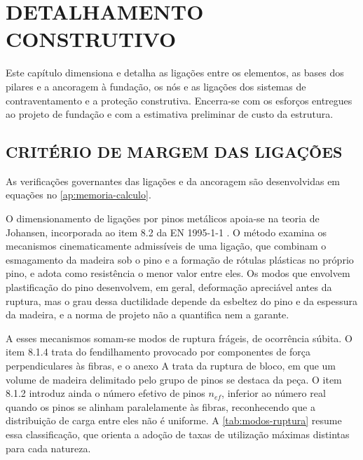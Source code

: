 
\chapter{DETALHAMENTO CONSTRUTIVO}\label{cap:detalhamento}

Este capítulo dimensiona e detalha as ligações entre os elementos, as bases dos
pilares e a ancoragem à fundação, os nós e as ligações dos sistemas de
contraventamento e a proteção construtiva. Encerra-se com os esforços entregues
ao projeto de fundação e com a estimativa preliminar de custo da estrutura.

\section{CRITÉRIO DE MARGEM DAS LIGAÇÕES}\label{sec:criterio-ligacoes}

As verificações governantes das ligações e da ancoragem são desenvolvidas em
equações no \autoref{ap:memoria-calculo}.

O dimensionamento de ligações por pinos metálicos apoia-se na teoria de
Johansen, incorporada ao item 8.2 da EN 1995-1-1 \cite{EN1995-1-1:2004}. O
método examina os mecanismos cinematicamente admissíveis de uma ligação, que
combinam o esmagamento da madeira sob o pino e a formação de rótulas plásticas
no próprio pino, e adota como resistência o menor valor entre eles. Os modos
que envolvem plastificação do pino desenvolvem, em geral, deformação apreciável
antes da ruptura, mas o grau dessa ductilidade depende da esbeltez do pino e da
espessura da madeira, e a norma de projeto não a quantifica nem a garante.

A esses mecanismos somam-se modos de ruptura frágeis, de ocorrência súbita. O item 8.1.4 trata do fendilhamento
provocado por componentes de força perpendiculares às fibras, e o anexo A trata
da ruptura de bloco, em que um volume de madeira delimitado pelo grupo de pinos
se destaca da peça. O item 8.1.2 introduz ainda o número efetivo de pinos
$n_{ef}$, inferior ao número real quando os pinos se alinham paralelamente às
fibras, reconhecendo que a distribuição de carga entre eles não é uniforme. A
\autoref{tab:modos-ruptura} resume essa classificação, que orienta a adoção de
taxas de utilização máximas distintas para cada natureza.

